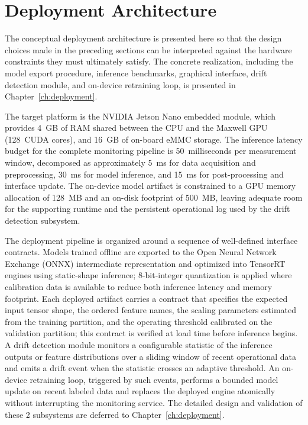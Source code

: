 \section{Deployment Architecture}
\label{sec:deployment-architecture}

The conceptual deployment architecture is presented here so that the design choices made in the preceding sections can be interpreted against the hardware constraints they must ultimately satisfy. The concrete realization, including the model export procedure, inference benchmarks, graphical interface, drift detection module, and on-device retraining loop, is presented in Chapter~\ref{ch:deployment}.

The target platform is the NVIDIA Jetson Nano embedded module, which provides 4~GB of RAM shared between the CPU and the Maxwell GPU (128~CUDA cores), and 16~GB of on-board eMMC storage. The inference latency budget for the complete monitoring pipeline is 50~milliseconds per measurement window, decomposed as approximately 5~ms for data acquisition and preprocessing, 30~ms for model inference, and 15~ms for post-processing and interface update. The on-device model artifact is constrained to a GPU memory allocation of 128~MB and an on-disk footprint of 500~MB, leaving adequate room for the supporting runtime and the persistent operational log used by the drift detection subsystem.

The deployment pipeline is organized around a sequence of well-defined interface contracts. Models trained offline are exported to the Open Neural Network Exchange (ONNX) intermediate representation and optimized into TensorRT engines using static-shape inference; 8-bit-integer quantization is applied where calibration data is available to reduce both inference latency and memory footprint. Each deployed artifact carries a contract that specifies the expected input tensor shape, the ordered feature names, the scaling parameters estimated from the training partition, and the operating threshold calibrated on the validation partition; this contract is verified at load time before inference begins. A drift detection module monitors a configurable statistic of the inference outputs or feature distributions over a sliding window of recent operational data and emits a drift event when the statistic crosses an adaptive threshold. An on-device retraining loop, triggered by such events, performs a bounded model update on recent labeled data and replaces the deployed engine atomically without interrupting the monitoring service. The detailed design and validation of these 2 subsystems are deferred to Chapter~\ref{ch:deployment}.

